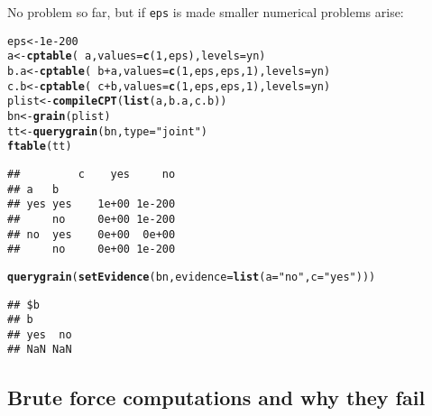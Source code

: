 \documentclass[10pt]{article}\usepackage[]{graphicx}\usepackage[]{color}
\makeatletter
\newcommand{\hlnum}[1]{\textcolor[rgb]{0.686,0.059,0.569}{#1}}%
\newcommand{\hlstr}[1]{\textcolor[rgb]{0.192,0.494,0.8}{#1}}%
\newcommand{\hlopt}[1]{\textcolor[rgb]{0,0,0}{#1}}%
\newcommand{\hlstd}[1]{\textcolor[rgb]{0.345,0.345,0.345}{#1}}%
\newcommand{\hlkwb}[1]{\textcolor[rgb]{0.69,0.353,0.396}{#1}}%
\newcommand{\hlkwc}[1]{\textcolor[rgb]{0.333,0.667,0.333}{#1}}%
\newcommand{\hlkwd}[1]{\textcolor[rgb]{0.737,0.353,0.396}{\textbf{#1}}}%
\newenvironment{kframe}{%
 \def\at@end@of@kframe{}%
 \ifinner\ifhmode%
  \def\at@end@of@kframe{\end{minipage}}%
  \begin{minipage}{\columnwidth}%
 \fi\fi%
 \def\FrameCommand##1{\hskip\@totalleftmargin \hskip-\fboxsep
 \colorbox{shadecolor}{##1}\hskip-\fboxsep
     \hskip-\linewidth \hskip-\@totalleftmargin \hskip\columnwidth}%
 \MakeFramed {\advance\hsize-\width
   \@totalleftmargin\z@ \linewidth\hsize
   \@setminipage}}%
 {\par\unskip\endMakeFramed%
 \at@end@of@kframe}
\newenvironment{knitrout}{}{} %
\def\code#1{{\texttt{#1}}}
\makeatother
\begin{document}
No problem so far, but if \code{eps} is made smaller numerical
problems arise:
\begin{knitrout}
\color{fgcolor}\begin{kframe}
\begin{alltt}
\hlstd{eps}  \hlkwb{<-} \hlnum{1e-200}
\hlstd{a}    \hlkwb{<-} \hlkwd{cptable}\hlstd{(}\hlopt{~}\hlstd{a,}   \hlkwc{values}\hlstd{=}\hlkwd{c}\hlstd{(}\hlnum{1}\hlstd{, eps),}\hlkwc{levels}\hlstd{=yn)}
\hlstd{b.a}  \hlkwb{<-} \hlkwd{cptable}\hlstd{(}\hlopt{~}\hlstd{b}\hlopt{+}\hlstd{a,} \hlkwc{values}\hlstd{=}\hlkwd{c}\hlstd{(}\hlnum{1}\hlstd{, eps, eps,} \hlnum{1}\hlstd{),}\hlkwc{levels}\hlstd{=yn)}
\hlstd{c.b}  \hlkwb{<-} \hlkwd{cptable}\hlstd{(}\hlopt{~}\hlstd{c}\hlopt{+}\hlstd{b,} \hlkwc{values}\hlstd{=}\hlkwd{c}\hlstd{(}\hlnum{1}\hlstd{, eps, eps,} \hlnum{1}\hlstd{),}\hlkwc{levels}\hlstd{=yn)}
\hlstd{plist} \hlkwb{<-} \hlkwd{compileCPT}\hlstd{(}\hlkwd{list}\hlstd{(a, b.a, c.b))}
\hlstd{bn}   \hlkwb{<-} \hlkwd{grain}\hlstd{(plist)}
\hlstd{tt}   \hlkwb{<-} \hlkwd{querygrain}\hlstd{(bn,} \hlkwc{type}\hlstd{=}\hlstr{"joint"}\hlstd{)}
\hlkwd{ftable}\hlstd{(tt)}
\end{alltt}
\begin{verbatim}
##         c    yes     no
## a   b                  
## yes yes    1e+00 1e-200
##     no     0e+00 1e-200
## no  yes    0e+00  0e+00
##     no     0e+00 1e-200
\end{verbatim}
\begin{alltt}
\hlkwd{querygrain}\hlstd{(}\hlkwd{setEvidence}\hlstd{(bn,} \hlkwc{evidence}\hlstd{=}\hlkwd{list}\hlstd{(}\hlkwc{a}\hlstd{=}\hlstr{"no"}\hlstd{,} \hlkwc{c}\hlstd{=}\hlstr{"yes"}\hlstd{)))}
\end{alltt}
\begin{verbatim}
## $b
## b
## yes  no 
## NaN NaN
\end{verbatim}
\end{kframe}
\end{knitrout}


\subsection{Brute force computations and why they fail}
\label{sec:brute-force-comp}
\end{document}
